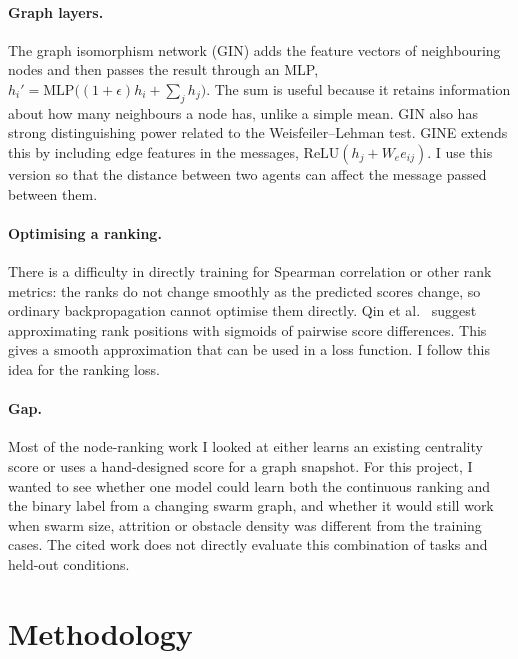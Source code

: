 \documentclass[11pt,a4paper]{article}
\begin{document}
\paragraph{Graph layers.} The graph isomorphism network (GIN) \cite{xu2019gin} adds the feature vectors of neighbouring
nodes and then passes the result through an MLP,
$h_i'=\mathrm{MLP}\big((1+\epsilon)h_i+\sum_j h_j\big)$. The sum is useful because it retains information
about how many neighbours a node has, unlike a simple mean. GIN also has strong distinguishing power related to
the Weisfeiler--Lehman test. GINE \cite{hu2020gine} extends this by including edge features in the messages,
$\mathrm{ReLU}(h_j+W_e e_{ij})$. I use this version so that the distance between two agents can affect the message passed between them.

\paragraph{Optimising a ranking.} There is a difficulty in directly training for Spearman correlation or other rank
metrics: the ranks do not change smoothly as the predicted scores change, so ordinary backpropagation cannot optimise
them directly. Qin et al.\ \cite{qin2010} suggest approximating rank positions with sigmoids of pairwise score
differences. This gives a smooth approximation that can be used in a loss function. I follow this idea for the ranking loss.

\paragraph{Gap.} Most of the node-ranking work I looked at either learns an existing centrality score or uses a
hand-designed score for a graph snapshot. For this project, I wanted to see whether one model could learn both the
continuous ranking and the binary label from a changing swarm graph, and whether it would still work when swarm size,
attrition or obstacle density was different from the training cases. The cited work does not directly evaluate this
combination of tasks and held-out conditions.

\section{Methodology}\label{sec:method}
\end{document}
